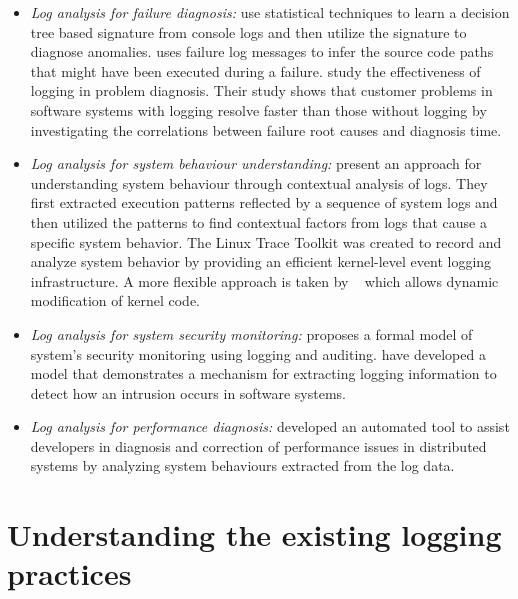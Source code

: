 \begin{itemize} [leftmargin=0.5in]
\item \emph{Log analysis for failure diagnosis:} \citet{xu2009detecting} use statistical techniques to learn a decision tree based signature from console logs and then utilize the signature to diagnose anomalies.  \cite{yuan2010sherlog} uses failure log messages to infer the source code paths that might have been executed during a failure. \citet{jiang2009understanding} study the effectiveness of logging in problem diagnosis. Their study shows that customer problems in software systems with logging resolve faster than those without logging by investigating the correlations between failure root causes and diagnosis time.
\item \emph{Log analysis for system behaviour understanding:} \citet{fu2013contextual} present an approach for understanding system behaviour through contextual analysis of logs. They first extracted execution patterns reflected by a sequence of system logs and then utilized the patterns to find contextual factors from logs that cause a specific system behavior. The Linux Trace Toolkit \cite{yaghmour2000measuringandcharacter} was created to record and analyze system behavior by providing an efficient kernel-level event logging infrastructure. A more flexible approach is taken by ~\cite{cantrill2004dynamic} which allows dynamic modification of kernel code.
\item \emph{Log analysis for system security monitoring:} \citet{bishop1989model} proposes a formal model of system's security monitoring using logging and auditing. \citet{peisert2007toward} have developed a model that demonstrates a mechanism for extracting logging information to detect how an intrusion occurs in software systems.
\item \emph{Log analysis for performance diagnosis:} \citet{nagaraj2012structured} developed an automated tool to assist developers in diagnosis and correction of performance issues in distributed systems by analyzing system behaviours extracted from the log data.
\end{itemize}



\section{Understanding the existing logging practices}  \label{understand-logging}

